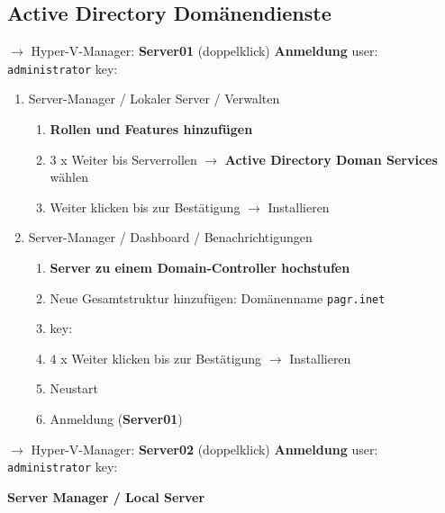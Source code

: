 \subsection{Active Directory
Domänendienste}\label{active-directory-domaenendienste}

$\to$ Hyper-V-Manager: \textbf{Server01} (doppelklick)
\textbf{Anmeldung} user: \verb|administrator| key:

\begin{enumerate}
\item
  Server-Manager / Lokaler Server / Verwalten

  \begin{enumerate}
  \def\labelenumii{\arabic{enumii}.}
  \item
    \textbf{Rollen und Features hinzufügen}
  \item
    3 x Weiter bis Serverrollen $\to$ \textbf{Active Directory Doman
    Services} wählen
  \item
    Weiter klicken bis zur Bestätigung $\to$ Installieren
  \end{enumerate}
\item
  Server-Manager / Dashboard / Benachrichtigungen

  \begin{enumerate}
  \def\labelenumii{\arabic{enumii}.}
  \item
    \textbf{Server zu einem Domain-Controller hochstufen}
  \item
    Neue Gesamtstruktur hinzufügen: Domänenname
    \verb|pagr.inet|
  \item
    key:
  \item
    4 x Weiter klicken bis zur Bestätigung $\to$ Installieren
  \item
    Neustart
  \item
    Anmeldung (\textbf{Server01})
  \end{enumerate}
\end{enumerate}

$\to$ Hyper-V-Manager: \textbf{Server02} (doppelklick)
\textbf{Anmeldung} user: \verb|administrator| key:

\textbf{Server Manager / Local Server}

